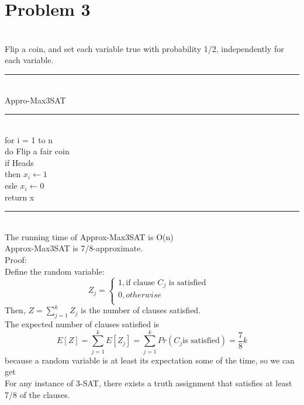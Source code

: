 \documentclass{article}
\begin{document}
\section*{Problem 3}
\quad\\
Flip a coin, and set each variable true with probability 1/2, independently for each variable.\\
\rule[5pt]{10cm}{0.1em}\\
Appro-Max3SAT\\
\rule[5pt]{10cm}{0.05em}\\
 \indent    for i = 1 to n\\

\indent \indent 			 do Flip a fair coin \\

\indent \indent \indent 		 if Heads\\

	\indent \indent \indent \indent 			 then $x_i \leftarrow 1$\\
	\indent \indent \indent \indent 		  esle $x_i \leftarrow 0$\\

	\indent return x\\
	\rule[5pt]{10cm}{0.05em}\\	
 The running time of Approx-Max3SAT is O(n)\\
 Approx-Max3SAT is 7/8-approximate.\\
 Proof:\\
 Define the random variable:\\
 \begin{equation}
 Z_j = \left\{ 
 \begin{array}{ll}
 1, \text{if clause } C_j \text{ is satisfied}\\
 0 ,otherwise&\\
 \end{array}\right.
 \end{equation}
 Then, $Z= \sum_{j=1}^{k}Z_j$  is the number of clauses satisfied.\\
 The expected number of clauses satisfied is\\
 $$ E[Z] = \sum_{j=1}^{k}E[Z_j] = \sum_{j=1}^{k}Pr(C_j \text{is satisfied}) = \frac{7}{8}k$$
 because a random variable is at least its expectation some of the time, so we can get\\
 For any instance of 3-SAT, there exists a truth assignment that satisfies at least 7/8 of the clauses.\\
 
 
\end{document}
